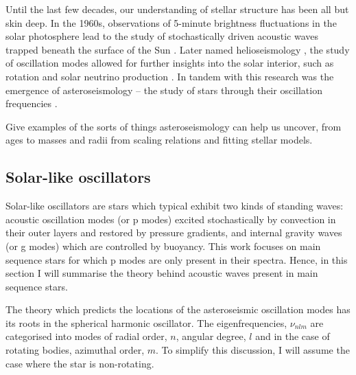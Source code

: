 Until the last few decades, our understanding of stellar structure has been all but skin deep. In the 1960s, observations of 5-minute brightness fluctuations in the solar photosphere lead to the study of stochastically driven acoustic waves trapped beneath the surface of the Sun \citep{Ulrich1970, Ando.Osaki1975}. Later named helioseismology \citep{Deubner.Gough1984}, the study of oscillation modes allowed for further insights into the solar interior, such as rotation \citep{Deubner.Ulrich.ea1979} and solar neutrino production \citep{Bahcall.Ulrich1988}. In tandem with this research was the emergence of asteroseismology -- the study of stars through their oscillation frequencies \citep{Christensen-Dalsgaard1984}.

Give examples of the sorts of things asteroseismology can help us uncover, from ages \citep[see, e.g.]{Ulrich1986, Soderblom2010, SilvaAguirre.Davies.ea2015} to masses and radii from scaling relations \citep{} and fitting stellar models\citep{}.

\subsection{Solar-like oscillators}

Solar-like oscillators are stars which typical exhibit two kinds of standing waves: acoustic oscillation modes (or p modes) excited stochastically by convection in their outer layers and restored by pressure gradients, and internal gravity waves (or g modes) which are controlled by buoyancy. This work focuses on main sequence stars for which p modes are only present in their spectra. Hence, in this section I will summarise the theory behind acoustic waves present in main sequence stars.

The theory which predicts the locations of the asteroseismic oscillation modes has its roots in the spherical harmonic oscillator. The eigenfrequencies, $\nu_{nlm}$ are categorised into modes of radial order, $n$, angular degree, $l$ and in the case of rotating bodies, azimuthal order, $m$. To simplify this discussion, I will assume the case where the star is non-rotating.

